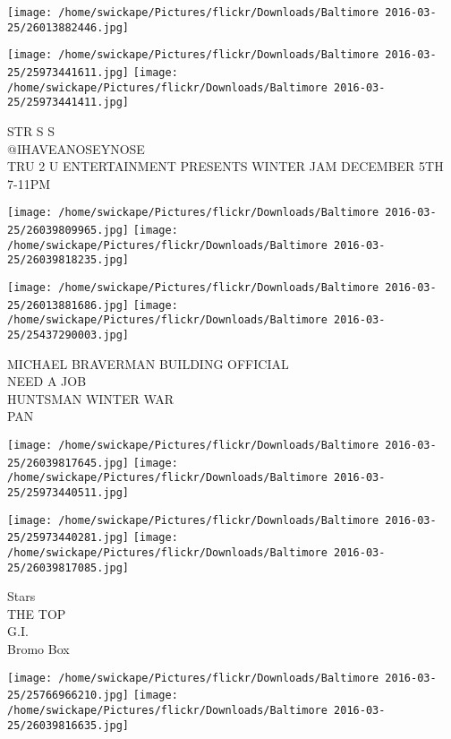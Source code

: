 \documentclass[10pt,letterpaper]{article}
\begin{document}
\texttt{[image: /home/swickape/Pictures/flickr/Downloads/Baltimore 2016-03-25/26013882446.jpg]}

\vspace{0.25in}
\texttt{[image: /home/swickape/Pictures/flickr/Downloads/Baltimore 2016-03-25/25973441611.jpg]}
\texttt{[image: /home/swickape/Pictures/flickr/Downloads/Baltimore 2016-03-25/25973441411.jpg]}

STR S S\\
@IHAVEANOSEYNOSE\\
TRU 2 U ENTERTAINMENT PRESENTS WINTER JAM DECEMBER 5TH 7{-}11PM\\
\pagebreak

\texttt{[image: /home/swickape/Pictures/flickr/Downloads/Baltimore 2016-03-25/26039809965.jpg]}
\texttt{[image: /home/swickape/Pictures/flickr/Downloads/Baltimore 2016-03-25/26039818235.jpg]}

\texttt{[image: /home/swickape/Pictures/flickr/Downloads/Baltimore 2016-03-25/26013881686.jpg]}
\texttt{[image: /home/swickape/Pictures/flickr/Downloads/Baltimore 2016-03-25/25437290003.jpg]}

MICHAEL BRAVERMAN BUILDING OFFICIAL\\
NEED A JOB\\
HUNTSMAN WINTER WAR\\
PAN\\
\pagebreak

\texttt{[image: /home/swickape/Pictures/flickr/Downloads/Baltimore 2016-03-25/26039817645.jpg]}
\texttt{[image: /home/swickape/Pictures/flickr/Downloads/Baltimore 2016-03-25/25973440511.jpg]}

\texttt{[image: /home/swickape/Pictures/flickr/Downloads/Baltimore 2016-03-25/25973440281.jpg]}
\texttt{[image: /home/swickape/Pictures/flickr/Downloads/Baltimore 2016-03-25/26039817085.jpg]}

Stars\\
THE TOP\\
G.I.\\
Bromo Box\\
\pagebreak

\texttt{[image: /home/swickape/Pictures/flickr/Downloads/Baltimore 2016-03-25/25766966210.jpg]}
\texttt{[image: /home/swickape/Pictures/flickr/Downloads/Baltimore 2016-03-25/26039816635.jpg]}
\end{document}
